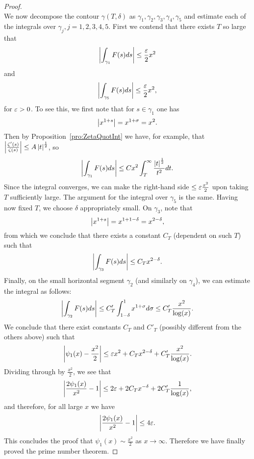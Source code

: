 \begin{proof}
\begin{equation*}
\end{equation*}
	We now decompose the contour $\gamma(T, \delta)$ as $\gamma_1, \gamma_2, \gamma_3, \gamma_4, \gamma_5$ and estimate each of the integrals over $\gamma_j, j=1,2,3,4,5$. First we contend that there exists $T$ so large that
\begin{equation*}
	\left|\int _{\gamma_1} F(s) ds\right|\leq \frac{\varepsilon}{2} x^2
\end{equation*}
	and
\begin{equation*}
	\left|\int _{\gamma_5} F(s) ds\right|\leq \frac{\varepsilon}{2} x^2,
\end{equation*}
	for $\varepsilon > 0$. To see this, we first note that for $s \in \gamma_1$ one has
\begin{equation*}
	\left|x^{1 + s}\right| = x^{1 + \sigma} = x^2.
\end{equation*}
	Then by Proposition~\ref{pro:ZetaQuotInt} we have, for example, that $\left|\frac{\zeta'(s)}{\zeta(s)}\right| \leq A \left|t\right|^{\frac{1}{2}}$, so
\begin{equation*}
	\left|\int _{\gamma_1} F(s) ds\right| \leq C x^2 \int _T ^\infty \frac{\left|t\right|^\frac{1}{2}}{t^2} dt.
\end{equation*}
	Since the integral converges, we can make the right-hand side $\leq \varepsilon \frac{x^2}{2}$ upon taking $T$ sufficiently large. The argument for the integral over $\gamma_5$ is the same. Having now fixed $T$, we choose $\delta$ appropriately small. On $\gamma_3$, note that
\begin{equation*}
	\left|x^{1 + s}\right| = x^{1 + 1 - \delta} = x^{2 - \delta},
\end{equation*}
	from which we conclude that there exists a constant $C_T$ (dependent on such $T$) such that
\begin{equation*}
	\left|\int _{\gamma_3} F(s) ds\right| \leq C_T x^{2 - \delta}.
\end{equation*}
	Finally, on the small horizontal segment $\gamma_2$ (and similarly on $\gamma_4$), we can estimate the integral as follows:
\begin{equation*}
	\left|\int _{\gamma_2} F(s) ds\right| \leq C'_T \int _{1 - \delta} ^1 x^{1 + \sigma} d\sigma \leq C'_T \frac{x^2}{\log(x)}.
\end{equation*}
	We conclude that there exist constants $C_T$ and $C'_T$ (possibly different from the others above) such that
\begin{equation*}
	\left|\psi_1(x) - \frac{x^2}{2}\right| \leq \varepsilon x^2 + C_T x^{2 - \delta} + C'_T \frac{x^2}{\log(x)}.
\end{equation*}
	Dividing through by $\frac{x^2}{2}$, we see that
\begin{equation*}
	\left|\frac{2 \psi_1(x)}{x^2} - 1\right| \leq 2\varepsilon + 2 C_T x^{-\delta} + 2 C'_T \frac{1}{\log(x)},
\end{equation*}
	and therefore, for all large $x$ we have
\begin{equation*}
	\left|\frac{2 \psi_1(x)}{x^2} - 1\right| \leq 4 \varepsilon.
\end{equation*}
	This concludes the proof that $\psi_1(x) \sim \frac{x^2}{2}$ as $x \to \infty$. Therefore we have finally proved the prime number theorem.
\end{proof}